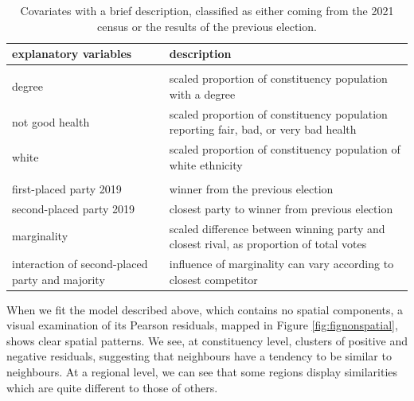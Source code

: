 \documentclass[webpdf,large,contemporary,namedate]{oup-authoring-template}
\theoremstyle{thmstyleone}
\theoremstyle{thmstyletwo}
\theoremstyle{thmstylethree}
\begin{document}
\begin{table}

\caption{\label{tab:tabcovariates}Covariates with a brief description, classified as either coming from the 2021 census or the results of the previous election.}
\centering
\begin{tabular}[t]{>{\raggedleft\arraybackslash}p{4cm}>{\raggedright\arraybackslash}p{12cm}}
\toprule
explanatory variables & description\\
\midrule
\addlinespace[0.3em]
\hline
\multicolumn{2}{l}{\textbf{census 2021}}\\
\hspace{1em}degree & scaled proportion of constituency population with a degree\\
\hspace{1em}not good health & scaled proportion of constituency population reporting fair, bad, or very bad health\\
\hspace{1em}white & scaled proportion of constituency population of white ethnicity\\
\addlinespace[0.3em]
\hline
\multicolumn{2}{l}{\textbf{status quo ante}}\\
\hspace{1em}first-placed party 2019 & winner from the previous election\\
\hspace{1em}second-placed party 2019 & closest party to winner from previous election\\
\hspace{1em}marginality & scaled difference between winning party and closest rival, as proportion of total votes\\
\hspace{1em}interaction of second-placed party and majority & influence of marginality can vary according to closest competitor\\
\bottomrule
\end{tabular}
\end{table}

When we fit the model described above, which contains no spatial
components, a visual examination of its Pearson residuals, mapped in
Figure \ref{fig:fignonspatial}, shows clear spatial patterns. We see, at
constituency level, clusters of positive and negative residuals,
suggesting that neighbours have a tendency to be similar to neighbours.
At a regional level, we can see that some regions display similarities
which are quite different to those of others.
\end{document}
